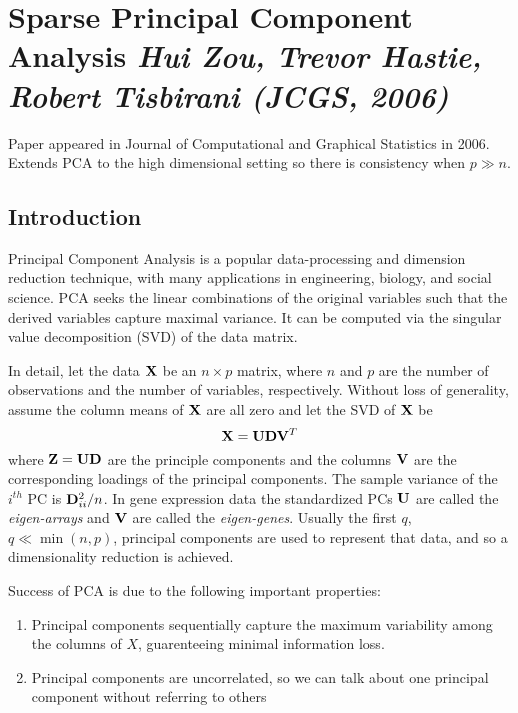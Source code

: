 \section{Sparse Principal Component Analysis \textit{\small Hui Zou, Trevor Hastie, Robert Tisbirani (JCGS, 2006)}}

Paper appeared in Journal of Computational and Graphical Statistics in 2006. Extends PCA to the high dimensional setting so there is consistency when $p \gg n$. 

\subsection{Introduction}

Principal Component Analysis is a popular data-processing and dimension reduction technique, with many applications in engineering, biology, and social science. PCA seeks the linear combinations of the original variables such that the derived variables capture maximal variance. It can be computed via the singular value decomposition (SVD) of the data matrix. 

In detail, let the data $\mathbf{X}$ be an $n\times p$ matrix, where $n$ and $p$ are the number of observations and the number of variables, respectively. Without loss of generality, assume the column means of $\mathbf{X}$ are all zero and let the SVD of $\mathbf{X}$ be 
\begin{equation}
	\label{eq:scpa-1.1}
	\mathbf{X} = \mathbf{U} \mathbf{D} \mathbf{V}^T
\end{equation}
where $\mathbf{Z} = \mathbf{U}\mathbf{D}$ are the principle components and the columns $\mathbf{V}$ are the corresponding loadings of the principal components. The sample variance of the $i^{th}$ PC is $\mathbf{D}^2_{ii}/n$. In gene expression data the standardized PCs $\mathbf{U}$ are called the \emph{eigen-arrays} and $\mathbf{V}$ are called the \emph{eigen-genes}. Usually the first $q$, $q \ll \min(n,p)$, principal components are used to represent that data, and so a dimensionality reduction is achieved. 

Success of PCA is due to the following important properties: 
\begin{enumerate}
 	\item Principal components sequentially capture the maximum variability among the columns of $X$, guarenteeing minimal information loss.
 	\item Principal components are uncorrelated, so we can talk about one principal component without referring to others
 \end{enumerate} 

